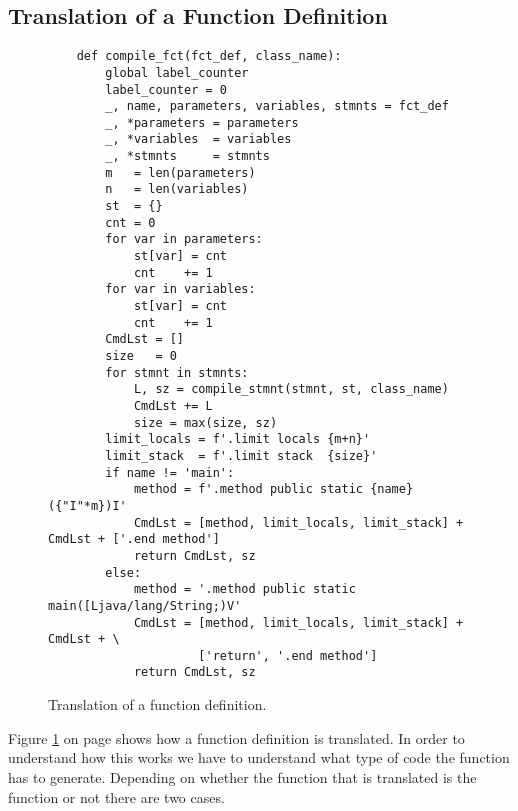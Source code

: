 \subsection{Translation of a Function Definition}
\begin{figure}[!ht]
\centering
\begin{verbatim}
    def compile_fct(fct_def, class_name):
        global label_counter
        label_counter = 0
        _, name, parameters, variables, stmnts = fct_def
        _, *parameters = parameters
        _, *variables  = variables
        _, *stmnts     = stmnts
        m   = len(parameters)
        n   = len(variables)
        st  = {}
        cnt = 0
        for var in parameters:
            st[var] = cnt
            cnt    += 1
        for var in variables:
            st[var] = cnt
            cnt    += 1
        CmdLst = []
        size   = 0
        for stmnt in stmnts:
            L, sz = compile_stmnt(stmnt, st, class_name)
            CmdLst += L
            size = max(size, sz)
        limit_locals = f'.limit locals {m+n}'
        limit_stack  = f'.limit stack  {size}'
        if name != 'main':
            method = f'.method public static {name}({"I"*m})I'
            CmdLst = [method, limit_locals, limit_stack] + CmdLst + ['.end method']
            return CmdLst, sz
        else:
            method = '.method public static main([Ljava/lang/String;)V'
            CmdLst = [method, limit_locals, limit_stack] + CmdLst + \
                     ['return', '.end method']
            return CmdLst, sz
\end{verbatim}
\vspace*{-0.3cm}
\caption{Translation of a function definition.}
\label{fig:Compiler.ipynb:compile:fct}
\end{figure}
\noindent
Figure \ref{fig:Compiler.ipynb:compile:fct} on page \pageref{fig:Compiler.ipynb:compile:fct} shows how a
function definition is translated.  
In order to understand how this works we have to understand what type of code the function  has
to generate.  Depending on whether the function that is translated is the function \mytt{main} or not there
are two cases.
